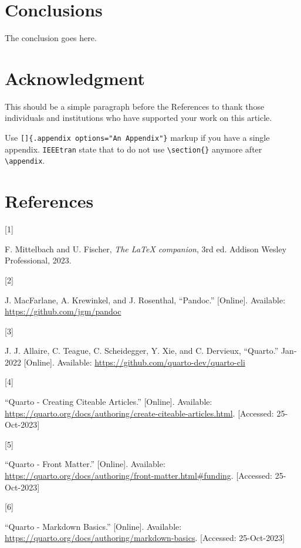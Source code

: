 \documentclass[
  journal,
]{IEEEtran}%
\newlength{\cslhangindent}
\newlength{\csllabelwidth}
\newenvironment{CSLReferences}[2] %
 {\begin{list}{}{%
  \setlength{\itemindent}{0pt}
  \setlength{\leftmargin}{0pt}
  \setlength{\parsep}{0pt}
  \ifodd #1
   \setlength{\leftmargin}{\cslhangindent}
   \setlength{\itemindent}{-1\cslhangindent}
  \fi
  \setlength{\itemsep}{#2\baselineskip}}}
 {\end{list}}
\newcommand{\CSLLeftMargin}[1]{\parbox[t]{\csllabelwidth}{\strut#1\strut}}
\newcommand{\CSLRightInline}[1]{\parbox[t]{\linewidth - \csllabelwidth}{\strut#1\strut}}
\theoremstyle{plain}
\theoremstyle{remark}
\begin{document}
\section{Conclusions}\label{conclusions}

The conclusion goes here.

\section*{Acknowledgment}\label{acknowledgment}

This should be a simple paragraph before the References to thank those
individuals and institutions who have supported your work on this
article.

\appendix[An Appendix]{}

Use \texttt{{[}{]}\{.appendix\ options="An\ Appendix"\}} markup if you
have a single appendix. \texttt{IEEEtran} state that to do not use
\texttt{\textbackslash{}section\{\}} anymore after
\texttt{\textbackslash{}appendix}.

\section*{References}\label{references}

\label{refs}
\begin{CSLReferences}{0}{0}
\CSLLeftMargin{{[}1{]} }%
\CSLRightInline{F. Mittelbach and U. Fischer, \emph{The {LaTeX}
companion}, 3rd ed. {Addison Wesley Professional}, 2023. }

\CSLLeftMargin{{[}2{]} }%
\CSLRightInline{J. MacFarlane, A. Krewinkel, and J. Rosenthal,
{``{Pandoc}.''} {[}Online{]}. Available:
\url{https://github.com/jgm/pandoc}}

\CSLLeftMargin{{[}3{]} }%
\CSLRightInline{J. J. Allaire, C. Teague, C. Scheidegger, Y. Xie, and C.
Dervieux, {``{Quarto}.''} Jan-2022 {[}Online{]}. Available:
\url{https://github.com/quarto-dev/quarto-cli}}

\CSLLeftMargin{{[}4{]} }%
\CSLRightInline{{``Quarto - {Creating Citeable Articles}.''}
{[}Online{]}. Available:
\url{https://quarto.org/docs/authoring/create-citeable-articles.html}.
{[}Accessed: 25-Oct-2023{]}}

\CSLLeftMargin{{[}5{]} }%
\CSLRightInline{{``Quarto - {Front Matter}.''} {[}Online{]}. Available:
\url{https://quarto.org/docs/authoring/front-matter.html\#funding}.
{[}Accessed: 25-Oct-2023{]}}

\CSLLeftMargin{{[}6{]} }%
\CSLRightInline{{``Quarto - {Markdown Basics}.''} {[}Online{]}.
Available: \url{https://quarto.org/docs/authoring/markdown-basics}.
{[}Accessed: 25-Oct-2023{]}}

\end{CSLReferences}
\end{document}
